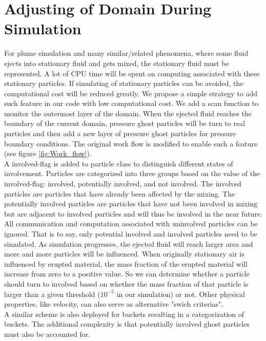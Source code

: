 \documentclass[procedia]{easychair}
\begin{document}
\section{Adjusting of Domain During Simulation} 
For plume simulation and many similar/related phenomena, where some fluid ejects into stationary fluid and gets mixed, the stationary fluid must be represented.
A lot of CPU time will be spent on computing associated with these stationary particles. If simulating of stationary particles can be avoided, the computational cost will be reduced greatly.
We propose a simple strategy to add such feature in our code with low computational cost. We add a scan function to monitor the outermost layer of the domain. When the ejected fluid reaches the boundary of the current domain, pressure ghost particles will be turn to real particles and then add a new layer of pressure ghost particles for pressure boundary conditions. The original work flow is modified to enable such a feature (see figure \ref{fig:Work_flow}).\\
A involved-flag is added to particle class to distinguish different states of involvement. Particles are categorized into three groups based on the value of the involved-flag: involved, potentially involved, and not involved. The involved particles are particles that have already been affected by the mixing. The potentially involved particles are particles that have not been involved in mixing but are adjacent to involved particles and will thus be involved in the near future. 
All communication and computation associated with uninvolved particles can be ignored. That is to say, only potential involved and involved particles need to be simulated.
As simulation progresses, the ejected fluid will reach larger area and more and more particles will be influenced. When originally stationary air is influenced by erupted material, the mass fraction of the erupted material will increase from zero to a positive value. So we can determine whether a particle should turn to involved based on whether the mass fraction of that particle is larger than a given threshold ($10^{-5} $ in our simulation) or not. Other physical properties, like velocity, can also serve as alternative "swich criterias".\\
A similar scheme is also deployed for buckets resulting in a categorization of buckets. The additional complexity is that potentially involved ghost particles must also be accounted for.
\end{document}
